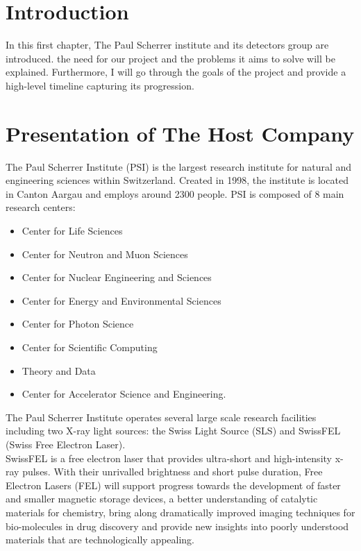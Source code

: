 \begin{spacing}{1.2}

    \section*{Introduction}
    In this first chapter, The Paul Scherrer institute and its detectors group are introduced.
    the need for our project and the problems it aims to solve will be explained. Furthermore,
    I will go through the goals of the project and provide a high-level timeline
    capturing its progression.

    \section{Presentation of The Host Company}
    The Paul Scherrer Institute (PSI) is the largest research institute for natural and engineering sciences within Switzerland.
    Created in 1998, the institute is located in Canton Aargau and employs around 2300 people.
    PSI is composed of 8 main research centers:
    \begin{itemize}
        \item Center for Life Sciences
        \item Center for Neutron and Muon Sciences
        \item Center for Nuclear Engineering and Sciences
        \item Center for Energy and Environmental Sciences
        \item Center for Photon Science
        \item Center for Scientific Computing
        \item Theory and Data
        \item Center for Accelerator Science and Engineering.
    \end{itemize}

    The Paul Scherrer Institute operates several large scale research facilities including two
    X-ray light sources: the Swiss Light Source (SLS) and SwissFEL (Swiss Free Electron Laser).\\


    SwissFEL is a free electron laser
    that provides ultra-short and high-intensity x-ray pulses. With their unrivalled brightness
    and short pulse duration, Free Electron Lasers (FEL) will support progress
    towards the development of faster and smaller magnetic storage devices,
    a better understanding of catalytic materials for chemistry, bring along dramatically
    improved imaging techniques for bio-molecules in drug discovery and provide new
    insights into poorly understood materials that are technologically appealing. \cite{whySwissFEL}\\



\end{spacing}
